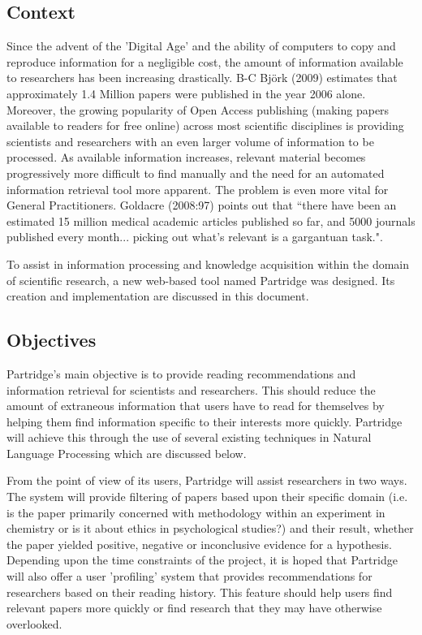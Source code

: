 %
%
\subsection{Context}

Since the advent of the 'Digital Age' and the ability of computers to copy and
reproduce information for a negligible cost, the amount of information
available to researchers has been increasing drastically.  B-C Bj\"{o}rk (2009)
estimates that approximately 1.4 Million papers were published in the year 2006
alone\cite{bjork2009}. Moreover, the growing popularity of Open Access
publishing (making papers available to readers for free online\cite{Suber2012})
across most scientific disciplines\cite{bjork2009}\cite{harnad2004comparing} is
providing scientists and researchers with an even larger volume of information
to be processed. As available information increases, relevant material becomes
progressively more difficult to find manually and the need for an automated
information retrieval tool more apparent. The problem is even more vital for
General Practitioners. Goldacre (2008:97) points out that ``there have been an
estimated 15 million medical academic articles published so far, and 5000
journals published every month... picking out what's relevant is a gargantuan
task."\cite{goldacre2008bad}.

To assist in information processing and knowledge acquisition within the domain
of scientific research, a new web-based tool named Partridge was designed. Its
creation and implementation are discussed in this document.

\subsection{Objectives}

Partridge's main objective is to provide reading recommendations and
information retrieval for scientists and researchers. This should reduce the
amount of extraneous information that users have to read for themselves by
helping them find information specific to their interests more quickly.
Partridge will achieve this through the use of several existing techniques in
Natural Language Processing which are discussed below.

From the point of view of its users, Partridge will assist researchers in two
ways. The system will provide filtering of papers based upon their
specific domain (i.e. is the paper primarily concerned with methodology within
an experiment in chemistry or is it about ethics in psychological studies?) and
their result, whether the paper yielded positive, negative or inconclusive
evidence for a hypothesis. Depending upon the time constraints of the
project, it is hoped that Partridge will also offer a user 'profiling' system
that provides recommendations for researchers based on their reading history.
This feature should help users find relevant papers more quickly or find
research that they may have otherwise overlooked.

